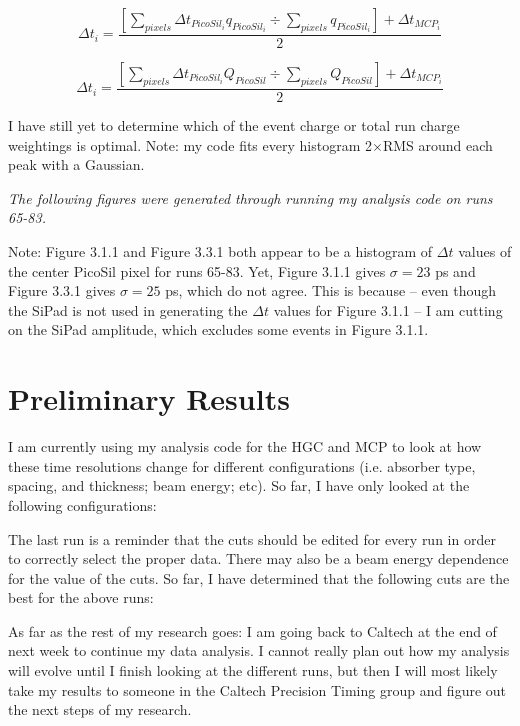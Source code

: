 \documentclass[12pt]{article}
\begin{document}
\[
\Delta t_i = 
\dfrac{
\left[ \sum_{pixels} \Delta t_{PicoSil_i} q_{PicoSil_i}
\div
\sum_{pixels} q_{PicoSil_i}
\right]
+ \Delta t_{MCP_i} 
} {2}
\]

\[
\Delta t_i = 
\dfrac{
\left[ \sum_{pixels} \Delta t_{PicoSil_i} Q_{PicoSil}
\div
\sum_{pixels} Q_{PicoSil}
\right]
+ \Delta t_{MCP_i} 
} {2}
\]

I have still yet to determine which of the event charge or total run charge weightings is optimal. 
Note: my code fits every histogram 2$\times$RMS around each peak with a Gaussian.

\textit{ The following figures were generated through running my analysis code on runs 65-83. }


Note: Figure 3.1.1 and Figure 3.3.1 both appear to be a histogram of $\Delta t$ values of the center PicoSil pixel for runs 65-83. 
Yet, Figure 3.1.1 gives $\sigma=23$ ps and Figure 3.3.1 gives $\sigma=25$ ps, which do not agree. 
This is because – even though the SiPad is not used in generating the $\Delta t$ values for Figure 3.1.1 – I am cutting on the SiPad amplitude, which excludes some events in Figure 3.1.1.

\setcounter{section}{3}
\section{Preliminary Results}
I am currently using my analysis code for the HGC and MCP to look at how these time resolutions change for different configurations (i.e. absorber type, spacing, and thickness; beam energy; etc). 
So far, I have only looked at the following configurations:


The last run is a reminder that the cuts should be edited for every run in order to correctly select the proper data. 
There may also be a beam energy dependence for the value of the cuts. 
So far, I have determined that the following cuts are the best for the above runs:


As far as the rest of my research goes: I am going back to Caltech at the end of next week to continue my data analysis. 
I cannot really plan out how my analysis will evolve until I finish looking at the different runs, but then I will most likely take my results to someone in the Caltech Precision Timing group and figure out the next steps of my research. 
\end{document}
